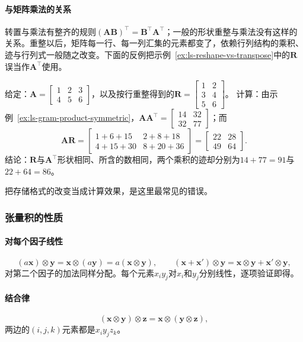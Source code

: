 \paragraph{与矩阵乘法的关系}
转置与乘法有整齐的规则$(\bm A\bm B)^\top=\bm B^\top\bm A^\top$；一般的形状重整与乘法没有这样的关系。重整以后，矩阵每一行、每一列汇集的元素都变了，依赖行列结构的乘积、迹与行列式一般随之改变。下面的反例把示例~\ref{ex:ls-reshape-vs-transpose}中的$\bm R$误当作$\bm A^\top$使用。
\begin{example}[反例：重整不能代替转置]
\label{ex:ls-reshape-breaks-product}
给定：$\bm A=\left[\begin{smallmatrix}1&2&3\\4&5&6\end{smallmatrix}\right]$，以及按行重整得到的$\bm R=\left[\begin{smallmatrix}1&2\\3&4\\5&6\end{smallmatrix}\right]$。
计算：由示例~\ref{ex:ls-gram-product-symmetric}，$\bm A\bm A^\top=\left[\begin{smallmatrix}14&32\\32&77\end{smallmatrix}\right]$；而
\[
 \bm A\bm R=\begin{bmatrix}1+6+15&2+8+18\\4+15+30&8+20+36\end{bmatrix}=\begin{bmatrix}22&28\\49&64\end{bmatrix}.
\]
结论：$\bm R$与$\bm A^\top$形状相同、所含的数相同，两个乘积的迹却分别为$14+77=91$与$22+64=86$。
\end{example}
把存储格式的改变当成计算效果，是这里最常见的错误。

\subsubsection{张量积的性质}

\paragraph{对每个因子线性}
\[
 (a\bm x)\otimes\bm y=\bm x\otimes(a\bm y)=a(\bm x\otimes\bm y),\qquad
 (\bm x+\bm x')\otimes\bm y=\bm x\otimes\bm y+\bm x'\otimes\bm y,
\]
对第二个因子的加法同样分配。每个元素$x_iy_j$对$x_i$和$y_j$分别线性，逐项验证即得。

\paragraph{结合律}
\[
 (\bm x\otimes\bm y)\otimes\bm z=\bm x\otimes(\bm y\otimes\bm z),
\]
两边的$(i,j,k)$元素都是$x_iy_jz_k$。

